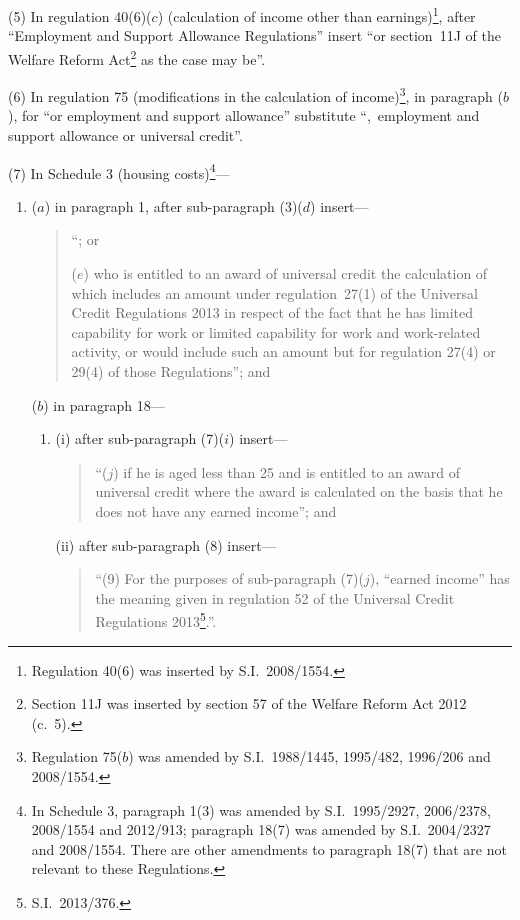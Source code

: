\documentclass[12pt,a4paper]{article}
\begin{document}
(5) In regulation 40(6)($c$)  (calculation of income other than earnings)\footnote{Regulation 40(6) was inserted by S.I.~2008/1554.}, after “Employment and Support Allowance Regulations” insert “or section~11J of the Welfare Reform Act\footnote{Section 11J was inserted by section 57 of the Welfare Reform Act 2012 (c.~5).} as the case may be”.

(6) In regulation 75 (modifications in the calculation of income)\footnote{Regulation 75($b$) was amended by S.I.~1988/1445, 1995/482, 1996/206 and 2008/1554.}, in paragraph ($b$), for “or employment and support allowance” substitute “,~employment and support allowance or universal credit”.

(7) In Schedule 3 (housing costs)\footnote{In Schedule 3, paragraph 1(3) was amended by S.I.~1995/2927, 2006/2378, 2008/1554 and 2012/913; paragraph 18(7) was amended by S.I.~2004/2327 and 2008/1554. There are other amendments to paragraph 18(7) that are not relevant to these Regulations.}—
\begin{enumerate}\item[]
($a$) in paragraph 1, after sub-paragraph (3)($d$)  insert—
\begin{quotation}
“; or

($e$) who is entitled to an award of universal credit the calculation of which includes an amount under regulation~27(1) of the Universal Credit Regulations 2013 in respect of the fact that he has limited capability for work or limited capability for work and work-related activity, or would include such an amount but for regulation 27(4) or 29(4) of those Regulations”; and
\end{quotation}

($b$) in paragraph 18—
\begin{enumerate}\item[]
(i) after sub-paragraph (7)($i$)  insert—
\begin{quotation}
“($j$) if he is aged less than 25 and is entitled to an award of universal credit where the award is calculated on the basis that he does not have any earned income”; and
\end{quotation}

(ii) after sub-paragraph (8) insert—
\begin{quotation}
“(9) For the purposes of sub-paragraph (7)($j$), “earned income” has the meaning given in regulation 52 of the Universal Credit Regulations 2013\footnote{S.I.~2013/376.}.”.
\end{quotation}
\end{enumerate}
\end{enumerate}
\end{document}
